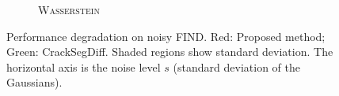 \begin{figure}[!t]
\begin{subfigure}[b]{0.315\textwidth}
        \caption{\textsc{Wasserstein}}
    \end{subfigure}
    \caption{Performance degradation on noisy FIND. Red: Proposed method; Green: CrackSegDiff. Shaded regions show standard deviation. The horizontal axis is the noise level $s$ (standard deviation of the Gaussians).}
    \label{fig:Results_noisy}
\end{figure}
